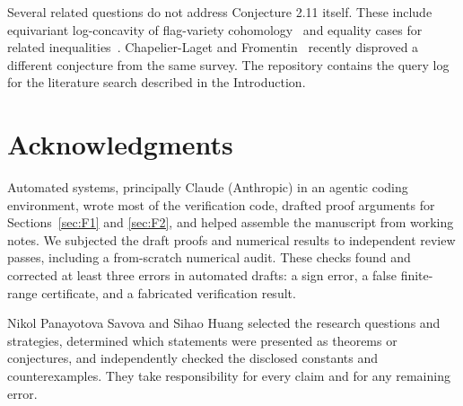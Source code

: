 \documentclass[11pt]{amsart}
\theoremstyle{plain}
\theoremstyle{definition}
\theoremstyle{remark}
\begin{document}
Several related questions do not address Conjecture 2.11 itself. These
include equivariant log-concavity of flag-variety
cohomology~\cite{equivariant-logconcave} and equality cases for related
inequalities~\cite{stanley-yan,kahn-saks}. Chapelier-Laget and
Fromentin~\cite{chapelier-fromentin} recently disproved a different
conjecture from the same survey. The repository contains the query log for
the literature search described in the Introduction.

\section*{Acknowledgments}

Automated systems, principally Claude (Anthropic) in an agentic coding
environment, wrote most of the verification code, drafted proof arguments
for Sections~\ref{sec:F1} and \ref{sec:F2}, and helped assemble the
manuscript from working notes. We subjected the draft proofs and numerical
results to independent review passes, including a from-scratch numerical
audit. These checks found and corrected at least three errors in automated
drafts: a sign error, a false finite-range certificate, and a fabricated
verification result.

Nikol Panayotova Savova and Sihao Huang selected the research questions and
strategies, determined which statements were presented as theorems or
conjectures, and independently checked the disclosed constants and
counterexamples. They take responsibility for every claim and for any
remaining error.

\end{document}
